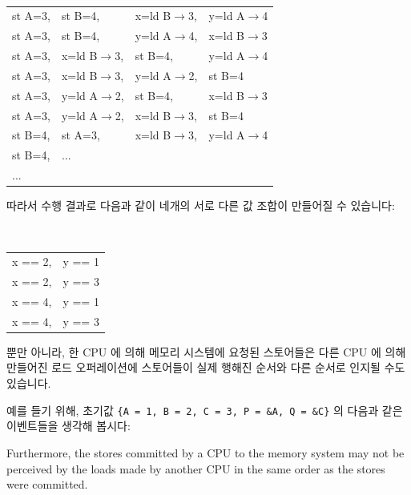 \vspace{5pt}
\begin{minipage}[t]{\columnwidth}
\tt
\scriptsize
\begin{tabular}{llll}
	st A=3, & st B=4, & x=ld B$\rightarrow$3, & y=ld A$\rightarrow$4 \\
	st A=3, & st B=4, & y=ld A$\rightarrow$4, & x=ld B$\rightarrow$3 \\
	st A=3, & x=ld B$\rightarrow$3, & st B=4, & y=ld A$\rightarrow$4 \\
	st A=3, & x=ld B$\rightarrow$3, & y=ld A$\rightarrow$2, & st B=4 \\
	st A=3, & y=ld A$\rightarrow$2, & st B=4, & x=ld B$\rightarrow$3 \\
	st A=3, & y=ld A$\rightarrow$2, & x=ld B$\rightarrow$3, & st B=4 \\
	st B=4, & st A=3, & x=ld B$\rightarrow$3, & y=ld A$\rightarrow$4 \\
	st B=4, & ... & & \\
	... & & & \\
\end{tabular}
\vspace{3pt}
\end{minipage}
%
따라서 수행 결과로 다음과 같이 네개의 서로 다른 값 조합이 만들어질 수 있습니다:

\vspace{5pt}
\begin{minipage}[t]{\columnwidth}
\tt
\scriptsize
\begin{tabular}{ll}
	x == 2, & y == 1 \\
	x == 2, & y == 3 \\
	x == 4, & y == 1 \\
	x == 4, & y == 3 \\
\end{tabular}
\end{minipage}
\vspace{5pt}

뿐만 아니라, 한 CPU 에 의해 메모리 시스템에 요청된 스토어들은 다른 CPU 에 의해
만들어진 로드 오퍼레이션에 스토어들이 실제 행해진 순서와 다른 순서로 인지될
수도 있습니다.

예를 들기 위해, 초기값 {\tt \{A = 1, B = 2, C = 3, P = \&A, Q = \&C\}} 의
다음과 같은 이벤트들을 생각해 봅시다:
\iffalse

Furthermore, the stores committed by a CPU to the memory system may not be
perceived by the loads made by another CPU in the same order as the stores were
committed.

